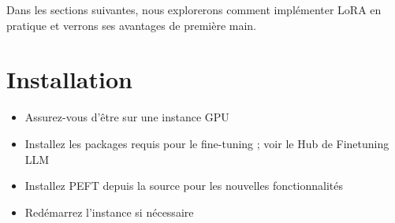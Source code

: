 \documentclass[
  letterpaper,
  DIV=11,
  numbers=noendperiod]{scrreprt}
\providecommand{\tightlist}{%
  \setlength{\itemsep}{0pt}\setlength{\parskip}{0pt}}\usepackage{longtable,booktabs,array}
\begin{document}
Dans les sections suivantes, nous explorerons comment implémenter LoRA
en pratique et verrons ses avantages de première main.

\section{Installation}\label{installation}

\begin{itemize}
\tightlist
\item
  Assurez-vous d'être sur une instance GPU
\item
  Installez les packages requis pour le fine-tuning ; voir le Hub de
  Finetuning LLM
\item
  Installez PEFT depuis la source pour les nouvelles fonctionnalités
\item
  Redémarrez l'instance si nécessaire
\end{itemize}
\end{document}
